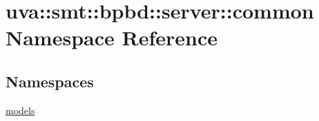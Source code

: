 \hypertarget{namespaceuva_1_1smt_1_1bpbd_1_1server_1_1common}{}\section{uva\+:\+:smt\+:\+:bpbd\+:\+:server\+:\+:common Namespace Reference}
\label{namespaceuva_1_1smt_1_1bpbd_1_1server_1_1common}
\subsection*{Namespaces}
\begin{DoxyCompactItemize}
\item 
 \hyperlink{namespaceuva_1_1smt_1_1bpbd_1_1server_1_1common_1_1models}{models}
\end{DoxyCompactItemize}

